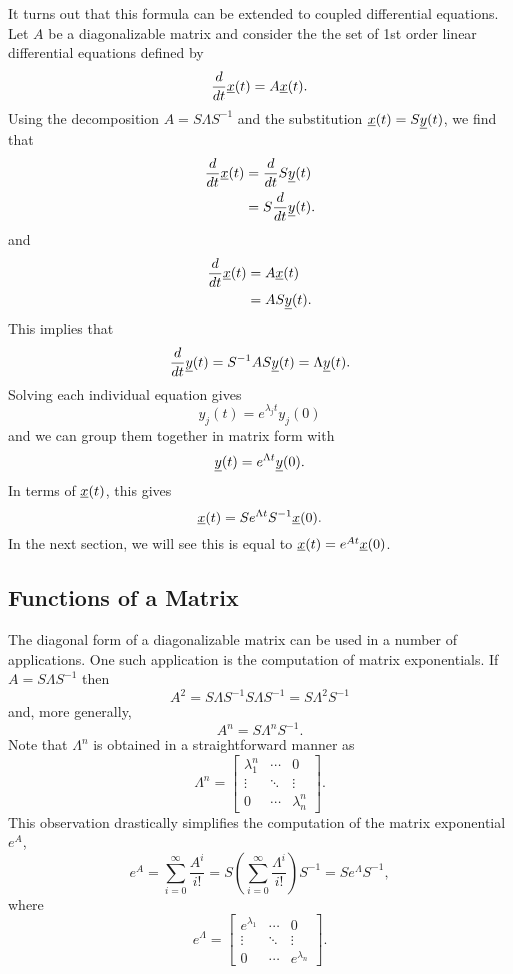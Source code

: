 It turns out that this formula can be extended to coupled differential equations.
Let $A$ be a diagonalizable matrix and consider the the set of 1st order linear differential equations defined by
\[ \frac{d}{dt} \underline{x}(t) = A \underline{x}(t). \]
Using the decomposition $A = S \Lambda S^{-1}$ and the substitution $\underline{x}(t) = S \underline{y}(t)$, we find that
\begin{align*}
\frac{d}{dt} \underline{x}(t)
& = \frac{d}{dt} S \underline{y}(t) \\
& = S \frac{d}{dt} \underline{y}(t).
\end{align*}
and
\begin{align*}
\frac{d}{dt} \underline{x}(t)
& = A \underline{x}(t) \\
& = A S \underline{y}(t).
\end{align*}
This implies that
\[ \frac{d}{dt} \underline{y}(t) = S^{-1} A S \underline{y}(t) = \Lambda \underline{y}(t). \]
Solving each individual equation gives
\[ y_j (t) = e^{\lambda_j t} y_j (0) \]
and we can group them together in matrix form with
\[ \underline{y}(t) = e^{\Lambda t} \underline{y}(0). \]
In terms of $\underline{x}(t)$, this gives
\[ \underline{x}(t) = S e^{\Lambda t} S^{-1} \underline{x}(0). \]
In the next section, we will see this is equal to $ \underline{x}(t) = e^{A t} \underline{x}(0)$.

\subsection{Functions of a Matrix}

The diagonal form of a diagonalizable matrix can be used in a number of applications.
One such application is the computation of matrix exponentials.
If $A = S \Lambda S^{-1}$ then
\begin{equation*}
A^2 = S \Lambda S^{-1} S \Lambda S^{-1}
= S \Lambda^2 S^{-1}
\end{equation*}
and, more generally,
\begin{equation*}
A^n = S \Lambda^n S^{-1}.
\end{equation*}
Note that $\Lambda^n$ is obtained in a straightforward manner as
\begin{equation*}
\Lambda^n = \begin{bmatrix}
\lambda_1^n & \cdots & 0 \\
\vdots & \ddots & \vdots \\
0 & \cdots & \lambda_n^n
\end{bmatrix} .
\end{equation*}
This observation drastically simplifies the computation of the matrix exponential $e^A$,
\begin{equation*}
e^A = \sum_{i=0}^{\infty} \frac{A^i}{i!}
= S \left( \sum_{i=0}^{\infty} \frac{\Lambda^i}{i!} \right) S^{-1}
= S e^{\Lambda} S^{-1},
\end{equation*}
where
\begin{equation*}
e^{\Lambda} = \begin{bmatrix}
e^{\lambda_1} & \cdots & 0 \\
\vdots & \ddots & \vdots \\
0 & \cdots & e^{\lambda_n}
\end{bmatrix} .
\end{equation*}

